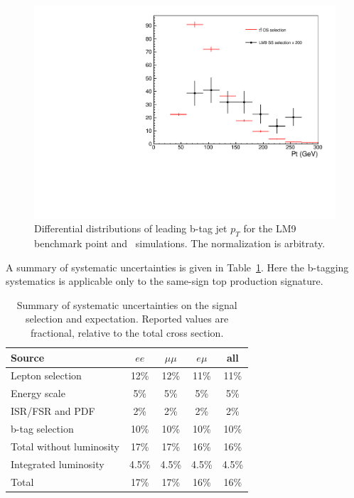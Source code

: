 \begin{figure}[htb]
\begin{center}
\includegraphics[width=0.6\linewidth, height=0.36\linewidth]{figs/bjetleading.pdf}
\caption{ Differential distributions of leading b-tag jet $p_T$ for the 
LM9 benchmark point and \ttbar\ simulations.
The normalization is arbitraty.\label{fig:lm9ttbar}}
\end{center}
\end{figure}


A summary of systematic uncertainties is given in Table~\ref{tab:systSumm}.
Here the b-tagging systematics is applicable only to the same-sign top production signature.

\begin{table}[h]
\begin{center}
\caption{\small\label{tab:systSumm}Summary of systematic uncertainties on the signal selection and
expectation. 
Reported values are fractional, relative to the total cross section.}
\begin{tabular}{lcccc}\hline
Source 					& $ee$		& $\mu\mu$		& $e\mu$	& all \\ \hline
Lepton selection			& 12\%		& 12\%			& 11\%		& 11\% \\
Energy scale				& 5\%		& 5\%			& 5\%		& 5\% \\
ISR/FSR and PDF				& 2\%		& 2\%			& 2\%		& 2\% 	\\
b-tag selection                         & 10\%          & 10\%                  & 10\%          & 10\% \\
Total without luminosity		& 17\%		& 17\%			& 16\%		& 16\%\\ \hline
Integrated luminosity			& 4.5\%		& 4.5\%			& 4.5\%		& 4.5\%	\\ \hline
Total 					& 17\%	 	& 17\%	 		& 16\% 		& 16\% \\
\hline
\end{tabular}
\end{center}
\end{table}

